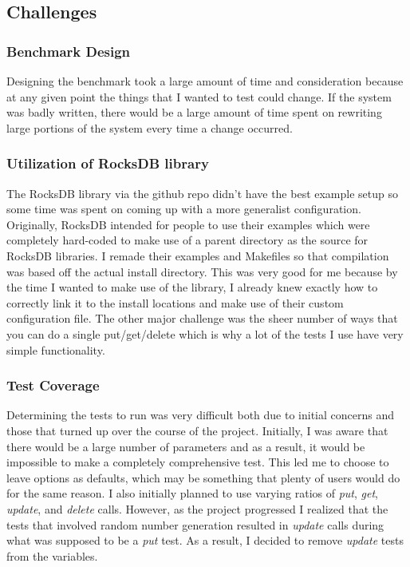 \documentclass[twocolumn,11pt]{article}
\begin{document}
\subsection{Challenges}

\subsubsection{Benchmark Design}

Designing the benchmark took a large amount of time and consideration because at
any given point the things that I wanted to test could change. If the system was
badly written, there would be a large amount of time spent on rewriting large
portions of the system every time a change occurred.

\subsubsection{Utilization of RocksDB library}

The RocksDB library via the github repo didn't have the best example setup so
some time was spent on coming up with a more generalist configuration.
Originally, RocksDB intended for people to use their examples which were
completely hard-coded to make use of a parent directory as the source for
RocksDB libraries. I remade their examples and Makefiles so that compilation was
based off the actual install directory. This was very good for me because by the
time I wanted to make use of the library, I already knew exactly how to
correctly link it to the install locations and make use of their custom
configuration file. The other major challenge was the sheer number of ways that
you can do a single put/get/delete which is why a lot of the tests I use have
very simple functionality.

\subsubsection{Test Coverage}

Determining the tests to run was very difficult both due to initial concerns and
those that turned up over the course of the project. Initially, I was aware that
there would be a large number of parameters and as a result, it would be
impossible to make a completely comprehensive test. This led me to choose to
leave options as defaults, which may be something that plenty of users would do
for the same reason. I also initially planned to use varying ratios of
\textit{put}, \textit{get}, \textit{update}, and \textit{delete} calls. However,
as the project progressed I realized that the tests that involved random number
generation resulted in \textit{update} calls during what was supposed to be a
\textit{put} test. As a result, I decided to remove \textit{update} tests from
the variables.
\end{document}

